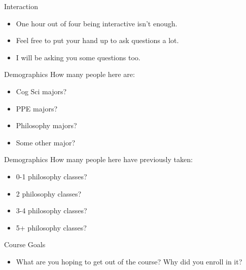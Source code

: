 \documentclass[
  17pt,
  letterpaper,
  ignorenonframetext,
  aspectratio=169,
  handout]{beamer}
\providecommand{\tightlist}{%
  \setlength{\itemsep}{0pt}\setlength{\parskip}{0pt}}\usepackage{longtable,booktabs,array}
\begin{document}
\begin{frame}{Interaction}
\protect\hypertarget{interaction}{}
\begin{itemize}[<+->]
\tightlist
\item
  One hour out of four being interactive isn't enough.
\item
  Feel free to put your hand up to ask questions a lot.
\item
  I will be asking you some questions too.
\end{itemize}
\end{frame}

\begin{frame}{Demographics}
\protect\hypertarget{demographics}{}
How many people here are:

\begin{itemize}[<+->]
\tightlist
\item
  Cog Sci majors?
\item
  PPE majors?
\item
  Philosophy majors?
\item
  Some other major?
\end{itemize}
\end{frame}

\begin{frame}{Demographics}
\protect\hypertarget{demographics-1}{}
How many people here have previously taken:

\begin{itemize}[<+->]
\tightlist
\item
  0-1 philosophy classes?
\item
  2 philosophy classes?
\item
  3-4 philosophy classes?
\item
  5+ philosophy classes?
\end{itemize}
\end{frame}

\begin{frame}{Course Goals}
\protect\hypertarget{course-goals}{}
\begin{itemize}[<+->]
\tightlist
\item
  What are you hoping to get out of the course? Why did you enroll in
  it?
\end{itemize}
\end{frame}
\end{document}
